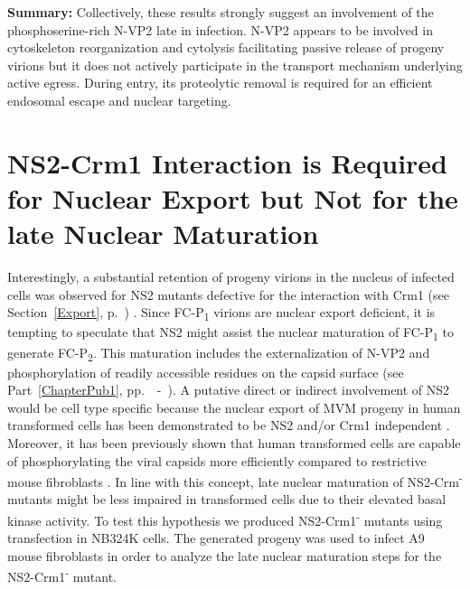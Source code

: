 \medskip
\textbf{Summary:} Collectively, these results strongly suggest an involvement of the phosphoserine-rich N-VP2 late in infection. N-VP2 appears to be involved in cytoskeleton reorganization and cytolysis facilitating passive release of progeny virions but it does not actively participate in the transport mechanism underlying active egress. During entry, its proteolytic removal is required for an efficient endosomal escape and nuclear targeting.         


\clearpage
\section{NS2-Crm1 Interaction is Required for Nuclear Export but Not for the late Nuclear Maturation}

Interestingly, a substantial retention of progeny virions in the nucleus of infected cells was observed for NS2 mutants defective for the interaction with Crm1 (see Section~\ref{Export}, p.~\pageref{Export}) \cite{pmid12239307}. Since FC-P\textsubscript{1} virions are nuclear export deficient, it is tempting to speculate that NS2 might assist the nuclear maturation of FC-P\textsubscript{1} to generate FC-P\textsubscript{2}. This maturation includes the externalization of N-VP2 and phosphorylation of readily accessible residues on the capsid surface (see Part~\ref{ChapterPub1}, pp.~\pageref{ChapterPub1}~-~\pageref{ChapterPub1End}). A putative direct or indirect involvement of NS2 would be cell type specific because the nuclear export of MVM progeny in human transformed cells has been demonstrated to be NS2 and/or Crm1 independent \cite{pmid2147041, pmid15367635}. Moreover, it has been previously shown that human transformed cells are capable of phosphorylating the viral capsids more efficiently compared to restrictive mouse fibroblasts \cite{pmid11069983}. In line with this concept, late nuclear maturation of NS2-Crm\textsuperscript{-} mutants might be less impaired in transformed cells due to their elevated basal kinase activity. To test this hypothesis we produced NS2-Crm1\textsuperscript{-} mutants using transfection in NB324K cells. The generated progeny was used to infect A9 mouse fibroblasts in order to analyze the late nuclear maturation steps for the NS2-Crm1\textsuperscript{-} mutant.       


